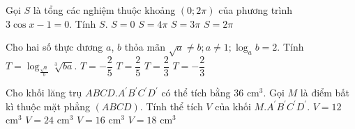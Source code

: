 \begin{ex}%
Gọi $S$ là tổng các nghiệm thuộc khoảng $(0;2\pi)$ của phương trình $3\cos x-1=0$. Tính $S$.
\choice
{$S=0$}
{$S=4\pi$}
{$S=3\pi$}
{\True $S=2\pi$}
\end{ex}
\begin{ex}%
Cho hai số thực dương $a$, $b$ thỏa mãn $\sqrt{a}\neq b; a\neq 1; \log_ab=2$. Tính $T=\log_{\frac{\sqrt{a}}{b}}\sqrt[3]{ba}$.
\choice
{$T=-\dfrac{2}{5}$}
{$T=\dfrac{2}{5}$}
{$T=\dfrac{2}{3}$}
{\True $T=-\dfrac{2}{3}$}
\end{ex}
\begin{ex}%
Cho khối lăng trụ $ABCD.A^\prime B^\prime C^\prime D^\prime$ có thể tích bằng $36$ cm$^3$. Gọi $M$ là điểm bất kì thuộc mặt phẳng $(ABCD)$. Tính thể tích $V$ của khối $M.A^\prime B^\prime C^\prime D^\prime$.
\choice
{\True $V=12$ cm$^3$}
{$V=24$ cm$^3$}
{$V=16$ cm$^3$}
{$V=18$ cm$^3$}
\end{ex}
